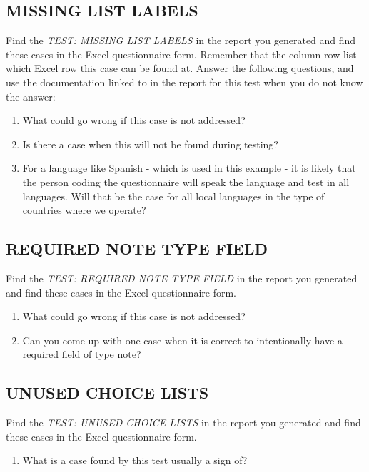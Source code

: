 \documentclass{tufte-handout}
\begin{document}
\subsection{MISSING LIST LABELS}
	Find the \textit{TEST: MISSING LIST LABELS} in the report you generated and find these cases in the Excel questionnaire form. Remember that the column row list which Excel row this case can be found at. Answer the following questions, and use the documentation linked to in the report for this test when you do not know the answer:
	
	\begin{enumerate}
		\item What could go wrong if this case is not addressed?
		\item Is there a case when this will not be found during testing? 
		\item For a language like Spanish - which is used in this example - it is likely that the person coding the questionnaire will speak the language and test in all languages. Will that be the case for all local languages in the type of countries where we operate?
	\end{enumerate}

\subsection{REQUIRED NOTE TYPE FIELD}
	Find the \textit{TEST: REQUIRED NOTE TYPE FIELD} in the report you generated and find these cases in the Excel questionnaire form.
	
	\begin{enumerate}
		\item What could go wrong if this case is not addressed?
		\item Can you come up with one case when it is correct to intentionally have a required field of type note?
	\end{enumerate}

\subsection{UNUSED CHOICE LISTS}
	Find the \textit{TEST: UNUSED CHOICE LISTS} in the report you generated and find these cases in the Excel questionnaire form.
	
	\begin{enumerate}
		\item What is a case found by this test usually a sign of? 
	\end{enumerate}
	
\end{document}
